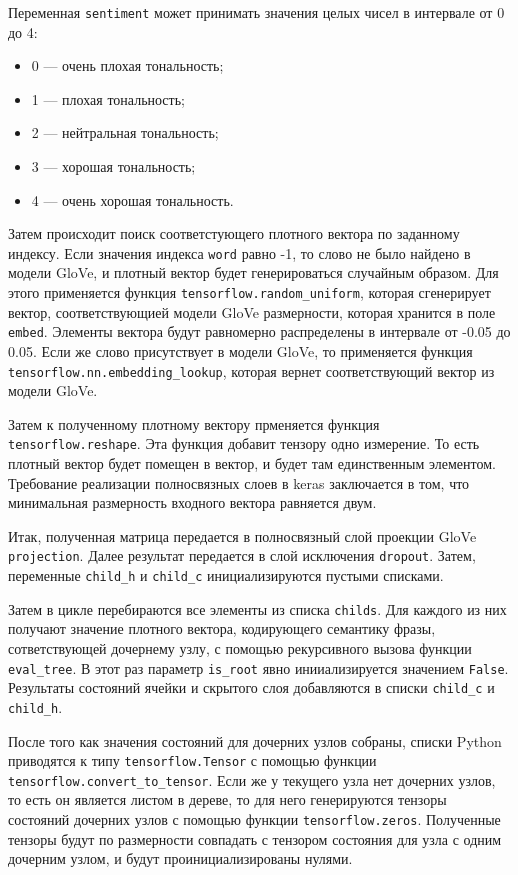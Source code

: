 Переменная \texttt{sentiment} может принимать значения целых чисел в интервале от 0 до 4:
\begin{itemize}
\item 0 --- очень плохая тональность;
\item 1 --- плохая тональность;
\item 2 --- нейтральная тональность;
\item 3 --- хорошая тональность;
\item 4 --- очень хорошая тональность.
\end{itemize}

Затем происходит поиск соответстующего плотного вектора по заданному индексу. Если значения индекса \texttt{word} равно -1, то слово не было найдено в модели GloVe, и плотный вектор будет генерироваться случайным образом. Для этого применяется функция \texttt{tensorflow.random\_uniform}, которая сгенерирует вектор, соответствующией модели GloVe размерности, которая хранится в поле \texttt{embed}. Элементы вектора будут равномерно распределены в интервале от -0.05 до 0.05. Если же слово присутствует в модели GloVe, то применяется функция \texttt{tensorflow.nn.embedding\_lookup}, которая вернет соответствующий вектор из модели GloVe.

Затем к полученному плотному вектору прменяется функция \texttt{tensor\-flow.reshape}. Эта функция добавит тензору одно измерение. То есть плотный вектор будет помещен в вектор, и будет там единственным элементом. Требование реализации полносвязных слоев в keras заключается в том, что минимальная размерность входного вектора равняется двум.

Итак, полученная матрица передается в полносвязный слой проекции GloVe \texttt{projection}. Далее результат передается в слой исключения \texttt{dropo\-ut}. Затем, переменные \texttt{child\_h} и \texttt{child\_c} инициализируются пустыми списками.

Затем в цикле перебираются все элементы из списка \texttt{childs}. Для каждого из них получают значение плотного вектора, кодирующего семантику фразы, сответствующей дочернему узлу, с помощью рекурсивного вызова функции \texttt{eval\_tree}. В этот раз параметр \texttt{is\_root} явно инииализируется значением \texttt{False}. Результаты состояний ячейки и скрытого слоя добавляются в списки \texttt{child\_c} и \texttt{child\_h}.

После того как значения состояний для дочерних узлов собраны, списки Python приводятся к типу \texttt{tensorflow.Tensor} с помощью функции \texttt{ten\-sorflow.convert\_to\_tensor}. Если же у текущего узла нет дочерних узлов, то есть он является листом в дереве, то для него генерируются тензоры состояний дочерних узлов с помощью функции \texttt{tensorflow.zeros}. Полученные тензоры будут по размерности совпадать с тензором состояния для узла с одним дочерним узлом, и будут проинициализированы нулями.

